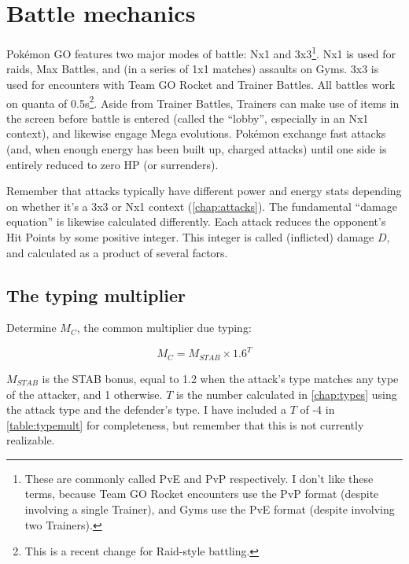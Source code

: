 \chapter{Battle mechanics\label{chap:battle}}
\nopagecolor
Pokémon GO features two major modes of battle: Nx1 and 3x3\footnote{These are commonly called PvE and PvP
 respectively. I don't like these terms, because Team GO Rocket encounters use the PvP format (despite involving
 a single Trainer), and Gyms use the PvE format (despite involving two Trainers).}.
Nx1 is used for raids, Max Battles, and (in a series of 1x1 matches) assaults on Gyms.
3x3 is used for encounters with Team GO Rocket and Trainer Battles.
All battles work on quanta of 0.5s\footnote{This is a recent change for Raid-style battling.}.
Aside from Trainer Battles, Trainers can make use of items in the screen before
  battle is entered (called the ``lobby'', especially in an Nx1 context), and
  likewise engage Mega evolutions.
Pokémon exchange fast attacks (and, when enough energy has been built up, charged attacks)
  until one side is entirely reduced to zero HP (or surrenders).

Remember that attacks typically have different power and energy stats depending on
  whether it's a 3x3 or Nx1 context (\autoref{chap:attacks}).
The fundamental ``damage equation'' is likewise calculated differently.
Each attack reduces the opponent's Hit Points by some positive integer.
This integer is called (inflicted) damage $D$, and calculated as a product of several factors.

\section{The typing multiplier\label{sec:typemult}}
Determine $M_C$, the common multiplier due typing:

\[ M_C = M_{STAB} \times 1.6^{T} \]

$M_{STAB}$ is the STAB bonus, equal to 1.2 when the attack's type matches any
  type of the attacker, and 1 otherwise.
$T$ is the number calculated in \autoref{chap:types} using the attack type
 and the defender's type.
I have included a $T$ of -4 in \autoref{table:typemult} for completeness,
 but remember that this is not currently realizable.

